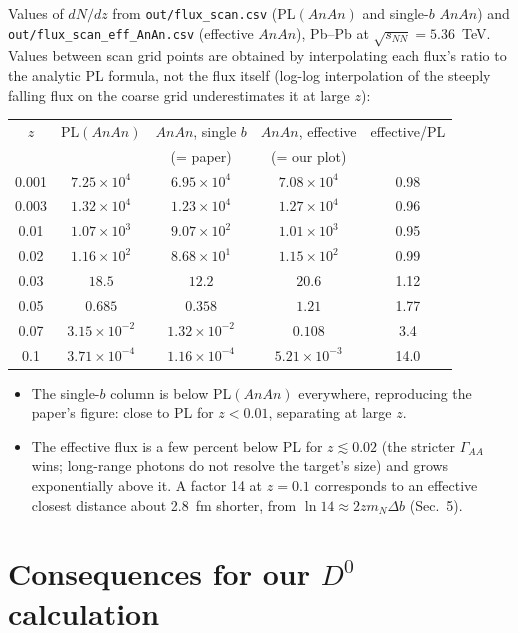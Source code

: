 \documentclass[11pt]{article}
\begin{document}
Values of $dN/dz$ from \texttt{out/flux\_scan.csv} (PL$(AnAn)$ and single-$b$
$AnAn$) and \texttt{out/flux\_scan\_eff\_AnAn.csv} (effective $AnAn$), Pb--Pb
at $\sqrt{s_{NN}}=5.36$~TeV. Values between scan grid points are obtained by
interpolating each flux's ratio to the analytic PL formula, not the flux
itself (log-log interpolation of the steeply falling flux on the coarse grid
underestimates it at large $z$):
\begin{center}
\begin{tabular}{ccccc}
\toprule
$z$ & PL$(AnAn)$ & $AnAn$, single $b$ & $AnAn$, effective & effective/PL \\
    &            & (= paper)           & (= our plot)      & \\
\midrule
0.001 & $7.25\times10^{4}$ & $6.95\times10^{4}$ & $7.08\times10^{4}$ & 0.98 \\
0.003 & $1.32\times10^{4}$ & $1.23\times10^{4}$ & $1.27\times10^{4}$ & 0.96 \\
0.01  & $1.07\times10^{3}$ & $9.07\times10^{2}$ & $1.01\times10^{3}$ & 0.95 \\
0.02  & $1.16\times10^{2}$ & $8.68\times10^{1}$ & $1.15\times10^{2}$ & 0.99 \\
0.03  & $18.5$             & $12.2$             & $20.6$             & 1.12 \\
0.05  & $0.685$            & $0.358$            & $1.21$             & 1.77 \\
0.07  & $3.15\times10^{-2}$ & $1.32\times10^{-2}$ & $0.108$           & 3.4 \\
0.1   & $3.71\times10^{-4}$ & $1.16\times10^{-4}$ & $5.21\times10^{-3}$ & 14.0 \\
\bottomrule
\end{tabular}
\end{center}
\begin{itemize}
  \item The single-$b$ column is below PL$(AnAn)$ everywhere, reproducing
    the paper's figure: close to PL for $z<0.01$, separating at large $z$.
  \item The effective flux is a few percent below PL for $z\lesssim0.02$
    (the stricter $\Gamma_{AA}$ wins; long-range photons do not resolve the
    target's size) and grows exponentially above it. A factor 14 at
    $z=0.1$ corresponds to an effective closest distance about 2.8~fm
    shorter, from $\ln 14 \approx 2 z m_N \Delta b$ (Sec.~5).
\end{itemize}

\section{Consequences for our $D^0$ calculation}
\end{document}
